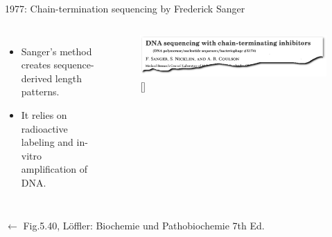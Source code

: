 \documentclass[10pt]{beamer}
\newcommand{\credit}[1]{{\vspace{\fill} \par \raggedleft \scriptsize \mdseries \color{mDarkBrown} #1 \par}}
\newcommand{\citeme}[1]{{\xspace\color{scAqua} \scriptsize [\cite{#1}]}}
\begin{document}
\begin{frame}{1977: Chain-termination sequencing by Frederick Sanger}
\begin{columns}[T,onlytextwidth]
\begin{itemize}
			\item Sanger's method creates sequence-derived length patterns.
			\item It relies on radioactive labeling and in-vitro amplification of DNA.
		\end{itemize}
		\begin{figure}
			\includegraphics[width=\textwidth]{./figures/sangerpaper.png}
			\caption{\citeme{Sanger1977}}
		\end{figure}
	\end{columns}
	\credit{$\leftarrow$ Fig.5.40, Löffler: Biochemie und Pathobiochemie 7th Ed.}
\end{frame}
\end{document}
